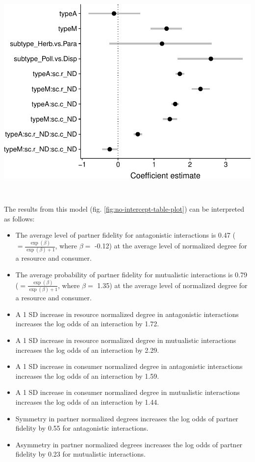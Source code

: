\documentclass[11pt,]{article}
\let\origfigure\figure
\let\endorigfigure\endfigure
\renewenvironment{figure}[1][2] {
    \expandafter\origfigure\expandafter[H]
} {
    \endorigfigure
}
\begin{document}
~

\begin{figure}

{\centering \includegraphics[width=0.75\linewidth]{reproduce_analyses_files/figure-latex/no-intercept-table-plot-1} 

}

\caption{Mean and 95\% credible intervals of fixed effects from model without intercepts.}\label{fig:no-intercept-table-plot}
\end{figure}

~

The results from this model (fig. \ref{fig:no-intercept-table-plot}) can
be interpreted as follows:

\begin{itemize}
\item
  The average level of partner fidelity for antagonistic interactions is
  0.47 (\(=\frac{\exp(\beta)}{\exp(\beta)+1}\), where \(\beta=\) -0.12)
  at the average level of normalized degree for a resource and consumer.
\item
  The average probability of partner fidelity for mutualistic
  interactions is 0.79 (\(=\frac{\exp(\beta)}{\exp(\beta)+1}\), where
  \(\beta=\) 1.35) at the average level of normalized degree for a
  resource and consumer.
\item
  A 1 SD increase in resource normalized degree in antagonistic
  interactions increases the log odds of an interaction by 1.72.
\item
  A 1 SD increase in resource normalized degree in mutualistic
  interactions increases the log odds of an interaction by 2.29.
\item
  A 1 SD increase in consumer normalized degree in antagonistic
  interactions increases the log odds of an interaction by 1.59.
\item
  A 1 SD increase in consumer normalized degree in mutualistic
  interactions increases the log odds of an interaction by 1.44.
\item
  Symmetry in partner normalized degrees increases the log odds of
  partner fidelity by 0.55 for antagonistic interactions.
\item
  Asymmetry in partner normalized degrees increases the log odds of
  partner fidelity by 0.23 for mutualistic interactions.
\end{itemize}
\end{document}
